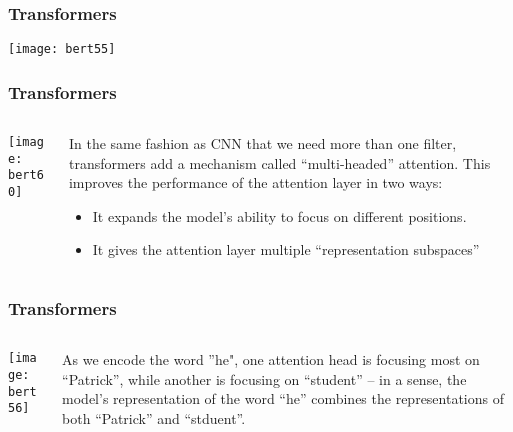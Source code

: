 \begin{frame}[fragile]\frametitle{Transformers}
	\begin{center}
	\texttt{[image: bert55]}
	\end{center}	
\end{frame}

\begin{frame}[fragile]\frametitle{Transformers}

\begin{columns}
    \begin{column}[T]{0.5\linewidth}
			\begin{center}
			\texttt{[image: bert60]}
			\end{center}		
		\end{column}
    \begin{column}[T]{0.5\linewidth}
		In the same fashion as CNN that we need more than one filter, transformers add a mechanism called ``multi-headed'' attention. This improves the performance of the attention layer in two ways:

      \begin{itemize}
			\item It expands the model's ability to focus on different positions.
			\item It gives the attention layer multiple ``representation subspaces''
			\end{itemize}
    \end{column}
  \end{columns}
			
\end{frame}

\begin{frame}[fragile]\frametitle{Transformers}

\begin{columns}
    \begin{column}[T]{0.5\linewidth}
			\begin{center}
			\texttt{[image: bert56]}
			\end{center}		
		\end{column}
    \begin{column}[T]{0.5\linewidth}
As we encode the word ”he", one attention head is focusing most on ``Patrick'', while another is focusing on ``student'' -- in a sense, the model's representation of the word ``he'' combines the representations of both ``Patrick'' and ``stduent''.

    \end{column}
  \end{columns}
			
\end{frame}

